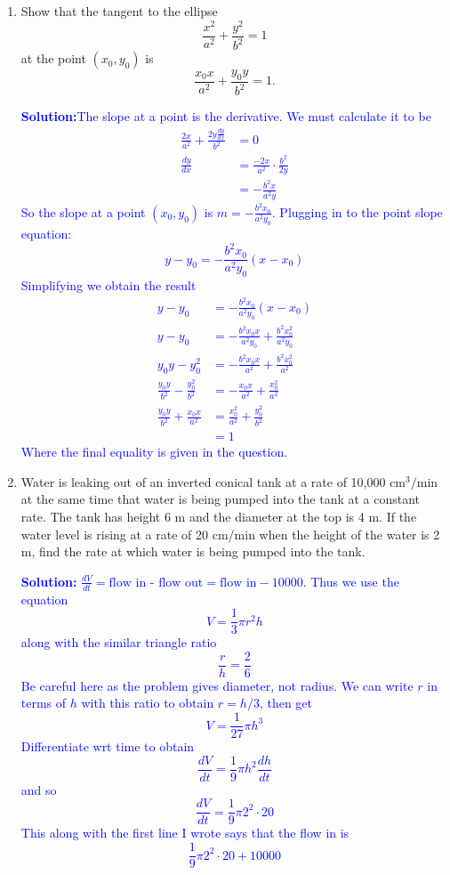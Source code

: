\documentclass[letterpaper,11pt]{article}
\newcommand{\sol}[2]{\begin{minipage}[c][#1]{\linewidth}{\textcolor{blue}{\textbf{Solution:}}\quad \textcolor{blue}{#2}}\end{minipage}}
\newcommand{\sol}[2]{\begin{minipage}[c][#1]{\linewidth}{\vfill}\end{minipage}}
\begin{document}
\begin{enumerate}
    \sol{1in}{The definition of continuous at $a$ is that $\lim_{x\to a} f(x) = f(a)$. In this case, neither $\lim_{x\to 0} f(x)$ nor $f(0)$ exist, so equality is false since neither even exist. The derivative is simply
    \[f'(x) = -\frac{2}{x^3}.\]}
    \newpage
    \item
    Show that the tangent to the ellipse 
    \[\frac{x^2}{a^2} + \frac{y^2}{b^2} = 1\]
    at the point $(x_0,y_0)$ is 
    \[\frac{x_0 x}{a^2} + \frac{y_0 y}{b^2} =1.\]

    \sol{}{The slope at a point is the derivative. We must calculate it to be
    \begin{align*}
        \frac{2x}{a^2} + \frac{2y\frac{dy}{dx}}{b^2} & = 0\\
        \frac{dy}{dx} & = \frac{-2x}{a^2} \cdot \frac{b^2}{2y}\\
        & = -\frac{b^2x}{a^2y}
    \end{align*}
    So the slope at a point $(x_0,y_0)$ is $m = -\frac{b^2 x_0}{a^2 y_0}$. Plugging in to the point slope equation:
    \[y - y_0 = -\frac{b^2 x_0}{a^2 y_0}(x-x_0)\]
    Simplifying we obtain the result
    \begin{align*}
        y - y_0 & = -\frac{b^2 x_0}{a^2 y_0}(x-x_0)\\
        y - y_0 & = -\frac{b^2 x_0 x}{a^2 y_0} + \frac{b^2 x_0^2}{a^2 y_0}\\
        y_0 y - y_0^2 & = -\frac{b^2 x_0 x}{a^2} + \frac{b^2 x_0^2}{a^2}\\
        \frac{y_0 y}{b^2} - \frac{y_0^2}{b^2} & = -\frac{ x_0 x}{a^2} + \frac{x_0^2}{a^2}\\
        \frac{y_0 y}{b^2} +\frac{x_0 x}{a^2} & = \frac{x_0^2}{a^2} + \frac{y_0^2}{b^2}\\
        & = 1
    \end{align*}
    Where the final equality is given in the question.
    }
    
    \newpage
    \item Water is leaking out of an inverted conical tank at a rate of 10,000 $\text{cm}^3/\text{min}$ at the same time that water is being pumped into the tank at a constant rate. The tank has height 6 m and the diameter at the top is 4 m. If the water level is rising at a rate of 20 cm/min when the height of the water is 2 m, find the rate at which water is being pumped into the tank.
    \sol{}{
    $\frac{dV}{dt} = \text{flow in - flow out} = \text{flow in} - 10000$. Thus we use the equation
    \[ V = \frac{1}{3} \pi r^2 h\]
    along with the similar triangle ratio
    \[\frac{r}{h} = \frac{2}{6}\]
    Be careful here as the problem gives diameter, not radius. We can write $r$ in terms of $h$ with this ratio to obtain $ r = h/3$, then get
    \[V = \frac{1}{27} \pi h^3\]
    Differentiate wrt time to obtain
    \[\frac{dV}{dt} = \frac{1}{9} \pi h^2 \frac{dh}{dt}\]
    and so 
    \[\frac{dV}{dt} = \frac{1}{9} \pi 2^2 \cdot 20\]
    This along with the first line I wrote says that the flow in is 
    \[\frac{1}{9} \pi 2^2 \cdot 20 + 10000\]
    }
    

\end{enumerate}
\end{document}
